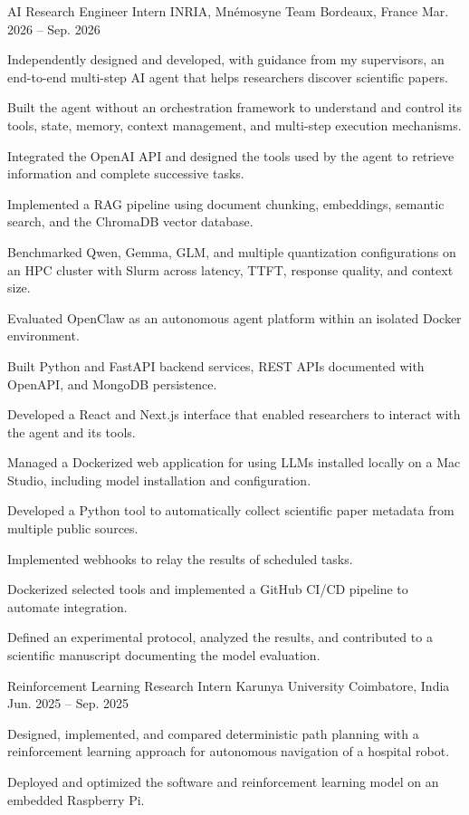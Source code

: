 
\begin{cventries}
  \cventry
    {AI Research Engineer Intern}
    {INRIA, Mnémosyne Team}
    {Bordeaux, France}
    {Mar. 2026 -- Sep. 2026}
    {
      \begin{cvitems}
        \item {Independently designed and developed, with guidance from my supervisors, an end-to-end multi-step AI agent that helps researchers discover scientific papers.}
        \item {Built the agent without an orchestration framework to understand and control its tools, state, memory, context management, and multi-step execution mechanisms.}
        \item {Integrated the OpenAI API and designed the tools used by the agent to retrieve information and complete successive tasks.}
        \item {Implemented a RAG pipeline using document chunking, embeddings, semantic search, and the ChromaDB vector database.}
        \item {Benchmarked Qwen, Gemma, GLM, and multiple quantization configurations on an HPC cluster with Slurm across latency, TTFT, response quality, and context size.}
        \item {Evaluated OpenClaw as an autonomous agent platform within an isolated Docker environment.}
        \item {Built Python and FastAPI backend services, REST APIs documented with OpenAPI, and MongoDB persistence.}
        \item {Developed a React and Next.js interface that enabled researchers to interact with the agent and its tools.}
        \item {Managed a Dockerized web application for using LLMs installed locally on a Mac Studio, including model installation and configuration.}
        \item {Developed a Python tool to automatically collect scientific paper metadata from multiple public sources.}
        \item {Implemented webhooks to relay the results of scheduled tasks.}
        \item {Dockerized selected tools and implemented a GitHub CI/CD pipeline to automate integration.}
        \item {Defined an experimental protocol, analyzed the results, and contributed to a scientific manuscript documenting the model evaluation.}
      \end{cvitems}
    }

  \cventry
    {Reinforcement Learning Research Intern}
    {Karunya University}
    {Coimbatore, India}
    {Jun. 2025 -- Sep. 2025}
    {
      \begin{cvitems}
        \item {Designed, implemented, and compared deterministic path planning with a reinforcement learning approach for autonomous navigation of a hospital robot.}
        \item {Deployed and optimized the software and reinforcement learning model on an embedded Raspberry Pi.}
      \end{cvitems}
    }
\end{cventries}
